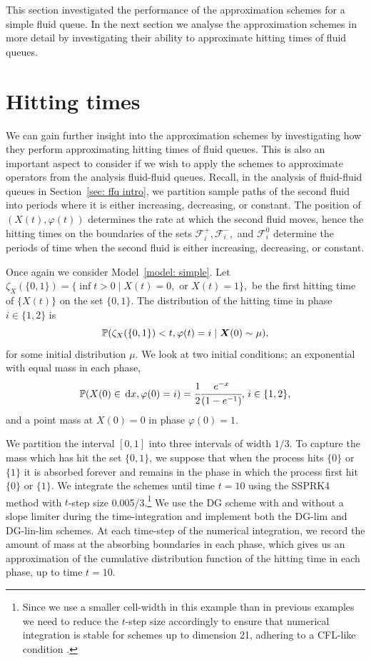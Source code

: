This section investigated the performance of the approximation schemes for a simple fluid queue. In the next section we analyse the approximation schemes in more detail by investigating their ability to approximate hitting times of fluid queues. 

\FloatBarrier
\section{Hitting times}\label{sec: hit approx}
We can gain further insight into the approximation schemes by investigating how they perform approximating hitting times of fluid queues. This is also an important aspect to consider if we wish to apply the schemes to approximate operators from the analysis fluid-fluid queues. Recall, in the analysis of fluid-fluid queues in Section~\ref{sec: ffq intro}, we partition sample paths of the second fluid into periods where it is either increasing, decreasing, or constant. The position of \((X(t),\varphi(t))\) determines the rate at which the second fluid moves, hence the hitting times on the boundaries of the sets \(\mathcal F_i^+, \mathcal F_i^-,\) and \(\mathcal F_i^0\) determine the periods of time when the second fluid is either increasing, decreasing, or constant.

Once again we consider Model~\ref{model: simple}. Let \(\zeta_{X}(\{0,1\}) = \{\inf t>0 \mid X(t)=0, \mbox{ or }X(t)=1\},\) be the first hitting time of \(\{X(t)\}\) on the set \(\{0,1\}\). The distribution of the hitting time in phase \(i\in\{1,2\}\) is 
\begin{equation}\label{eqn: hit cdf}\mathbb P(\zeta_{X}(\{0,1\}) < t, \varphi(t)=i\mid \boldsymbol X(0)\sim \mu),\end{equation}
for some initial distribution \(\mu\). We look at two initial conditions; an exponential with equal mass in each phase, 
\[\mathbb P(X(0)\in\, \mathrm{d} x,\varphi(0)=i) = \cfrac{1}{2}\cfrac{e^{-x}}{(1-e^{-1})},\,i\in\{1,2\},\]
and a point mass at \(X(0)=0\) in phase \(\varphi(0)=1\). 

We partition the interval \([0,1]\) into three intervals of width \(1/3\). To capture the mass which has hit the set \(\{0,1\}\), we suppose that when the process hits \(\{0\}\) or \(\{1\}\) it is absorbed forever and remains in the phase in which the process first hit \(\{0\}\) or \(\{1\}\). We integrate the schemes until time \(t=10\) using the SSPRK4 method with \(t\)-step size 0.005/3.\footnote{Since we use a smaller cell-width in this example than in previous examples we need to reduce the \(t\)-step size accordingly to ensure that numerical integration is stable for schemes up to dimension 21, adhering to a CFL-like condition \cite[Section~4.8]{nodalDGBook}.} We use the DG scheme with and without a slope limiter during the time-integration and implement both the DG-lim and DG-lin-lim schemes. At each time-step of the numerical integration, we record the amount of mass at the absorbing boundaries in each phase, which gives us an approximation of the cumulative distribution function of the hitting time in each phase, up to time \(t=10\). 

